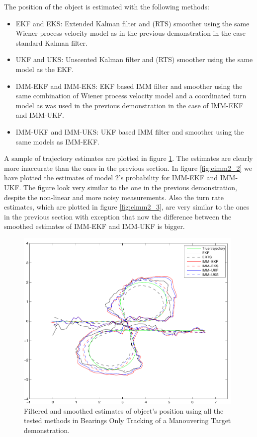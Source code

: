 The position of the object is estimated with the following methods:
\begin{itemize}
\item EKF and EKS: Extended Kalman filter and (RTS) smoother using the
same Wiener process velocity model as in the previous demonstration in
the case standard Kalman filter.
\item UKF and UKS: Unscented Kalman filter and (RTS) smoother using
the same model as the EKF.
\item IMM-EKF and IMM-EKS: EKF based IMM filter and smoother using the
same combination of Wiener process velocity model and a coordinated
turn model as was used in the previous demonstration in the case of
IMM-EKF and IMM-UKF.
\item IMM-UKF and IMM-UKS: UKF based IMM filter and smoother using the
same models as IMM-EKF.
\end{itemize}
%
A sample of trajectory estimates are plotted in figure
\ref{fig:eimm2_1}. The estimates are clearly more inaccurate than the
ones in the previous section. In figure \ref{fig:eimm2_2} we have
plotted the estimates of model 2's probability for IMM-EKF and
IMM-UKF. The figure look very similar to the one in the previous
demonstration, despite the non-linear and more noisy
measurements. Also the turn rate estimates, which are plotted in
figure \ref{fig:eimm2_3}, are very similar to the ones in the previous
section with exception that now the difference between the smoothed
estimates of IMM-EKF and IMM-UKF is bigger.

\begin{figure}
\begin{center}
\includegraphics[width=11cm]{pics/eimm2_1}
\caption{ Filtered and smoothed estimates of object's position using
all the tested methods in Bearings Only Tracking of a Manouvering
Target demonstration.  }
\label{fig:eimm2_1}
\end{center}
\end{figure}


